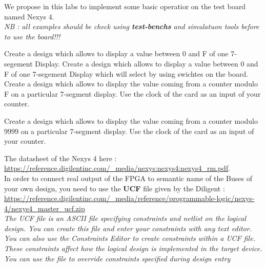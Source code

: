 \documentclass[12pt]{tdtp}
\begin{document}
\titre
We propose in this labs to implement some basic operatior on the test board named Nexys 4.\\

\textit {NB : all examples should be check using \textbf{test-benchs} and simulatuon tools before to use the board!!!}


\Exo
Create a design which allows to display a value between 0 and F of one 7-segement Display.
\Exo
Create a design which allows to display a value between 0 and F of one 7-segement Display which will select by using swichtes on the board.
\Exo
Create a design which allows to display the value coming from a counter modulo F on a particular 7-segment display. 
Use the clock of the card as an input of your counter.

\Exo
Create a design which allows to display the value coming from a counter modulo 9999 on a particular 7-segment display. 
Use the clock of the card as an input of your counter.

\newpage

\Note 

The datasheet of the Nexys 4 here : \url{https://reference.digilentinc.com/_media/nexys:nexys4:nexys4_rm.pdf}.\\

In order to connect real output of the FPGA to semantic name of the Buses of your own design, you need to use the \textbf{UCF} file given by the Diligent : \url{https://reference.digilentinc.com/_media/reference/programmable-logic/nexys-4/nexys4_master_ucf.zip}\\

\textit{The UCF file is an ASCII file specifying constraints and netlist on the logical design. 
	You can create this file and enter your constraints with any text editor.
You can also use the Constraints Editor to create constraints within a UCF file.
These constraints affect how the logical design is implemented in the target device.
You  can use the file to override constraints specified during design entry}

\end{document}
